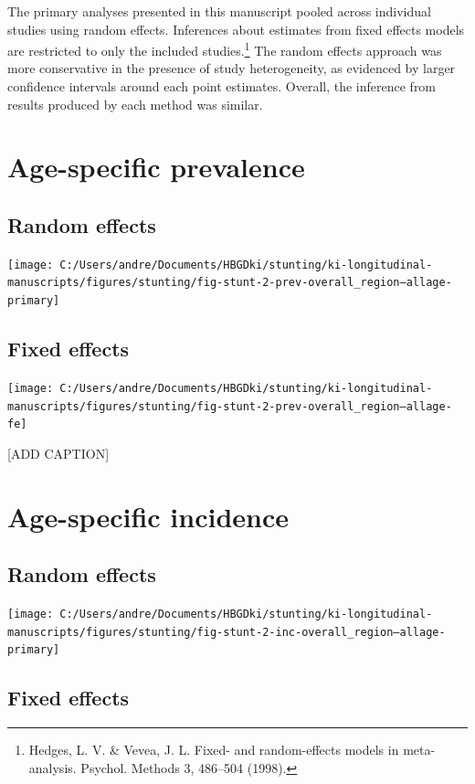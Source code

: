 \documentclass[9pt,]{book}
\let\rmarkdownfootnote\footnote%
\def\footnote{\protect\rmarkdownfootnote}
\begin{document}
The primary analyses presented in this manuscript pooled across
individual studies using random effects. Inferences about estimates from
fixed effects models are restricted to only the included
studies.\footnote{Hedges, L. V. \& Vevea, J. L. Fixed- and
  random-effects models in meta-analysis. Psychol. Methods 3, 486--504
  (1998).} The random effects approach was more conservative in the
presence of study heterogeneity, as evidenced by larger confidence
intervals around each point estimates. Overall, the inference from
results produced by each method was similar.

\section{Age-specific prevalence}\label{age-specific-prevalence-2}

\subsection{Random effects}\label{random-effects}

\texttt{[image: C:/Users/andre/Documents/HBGDki/stunting/ki-longitudinal-manuscripts/figures/stunting/fig-stunt-2-prev-overall\_region--allage-primary]}

\subsection{Fixed effects}\label{fixed-effects}

\texttt{[image: C:/Users/andre/Documents/HBGDki/stunting/ki-longitudinal-manuscripts/figures/stunting/fig-stunt-2-prev-overall\_region--allage-fe]}

{[}ADD CAPTION{]}

\section{Age-specific incidence}\label{age-specific-incidence-2}

\subsection{Random effects}\label{random-effects-1}

\texttt{[image: C:/Users/andre/Documents/HBGDki/stunting/ki-longitudinal-manuscripts/figures/stunting/fig-stunt-2-inc-overall\_region--allage-primary]}

\subsection{Fixed effects}\label{fixed-effects-1}
\end{document}
